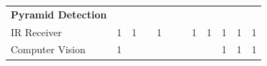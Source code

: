 \documentclass[12pt]{article}
\begin{document}
\begin{table}[H]
\begin{tabular}{p{15.645em}|c|c|c|c|c|c|c|c|c|c|c}
    \midrule
    \textbf{Pyramid Detection} &       &       &       &       &       &       &       &       &       &       &  \\
\rowcolor{green}    IR Receiver & 1     & 1     &       & 1     &       &       & 1     & 1     & 1     & 1     & 1 \\
    Computer Vision & 1     &       &       &       &       &       &       &       & 1     & 1     & 1 \\
    \end{tabular}%
  \label{tab:addlabel}%
\end{table}%
\end{document}
